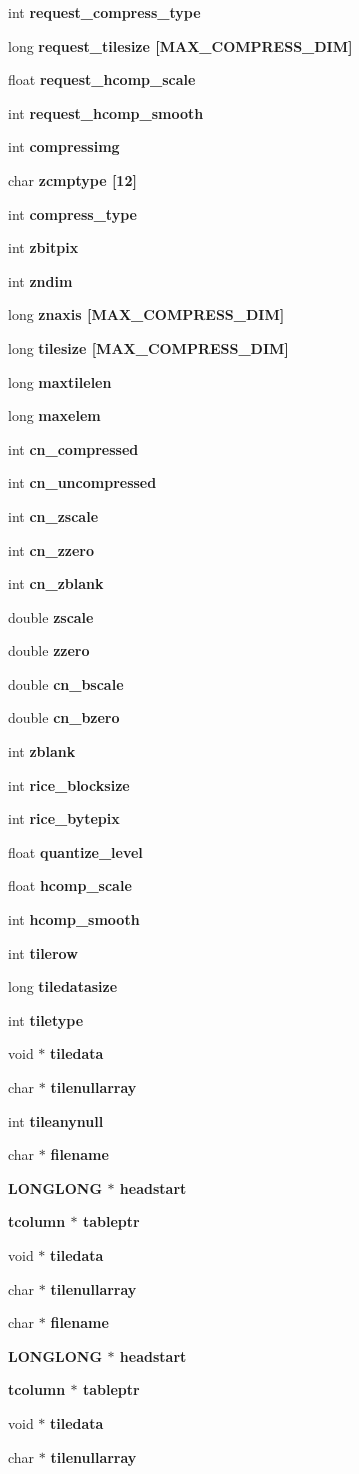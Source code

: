\begin{CompactItemize}
\item 
int \bf{request\_\-compress\_\-type}
\item 
long \bf{request\_\-tilesize} [MAX\_\-COMPRESS\_\-DIM]
\item 
float \bf{request\_\-hcomp\_\-scale}
\item 
int \bf{request\_\-hcomp\_\-smooth}
\item 
int \bf{compressimg}
\item 
char \bf{zcmptype} [12]
\item 
int \bf{compress\_\-type}
\item 
int \bf{zbitpix}
\item 
int \bf{zndim}
\item 
long \bf{znaxis} [MAX\_\-COMPRESS\_\-DIM]
\item 
long \bf{tilesize} [MAX\_\-COMPRESS\_\-DIM]
\item 
long \bf{maxtilelen}
\item 
long \bf{maxelem}
\item 
int \bf{cn\_\-compressed}
\item 
int \bf{cn\_\-uncompressed}
\item 
int \bf{cn\_\-zscale}
\item 
int \bf{cn\_\-zzero}
\item 
int \bf{cn\_\-zblank}
\item 
double \bf{zscale}
\item 
double \bf{zzero}
\item 
double \bf{cn\_\-bscale}
\item 
double \bf{cn\_\-bzero}
\item 
int \bf{zblank}
\item 
int \bf{rice\_\-blocksize}
\item 
int \bf{rice\_\-bytepix}
\item 
float \bf{quantize\_\-level}
\item 
float \bf{hcomp\_\-scale}
\item 
int \bf{hcomp\_\-smooth}
\item 
int \bf{tilerow}
\item 
long \bf{tiledatasize}
\item 
int \bf{tiletype}
\item 
void $\ast$ \bf{tiledata}
\item 
char $\ast$ \bf{tilenullarray}
\item 
int \bf{tileanynull}
\item 
char $\ast$ \bf{filename}
\item 
\bf{LONGLONG} $\ast$ \bf{headstart}
\item 
\bf{tcolumn} $\ast$ \bf{tableptr}
\item 
void $\ast$ \bf{tiledata}
\item 
char $\ast$ \bf{tilenullarray}
\item 
char $\ast$ \bf{filename}
\item 
\bf{LONGLONG} $\ast$ \bf{headstart}
\item 
\bf{tcolumn} $\ast$ \bf{tableptr}
\item 
void $\ast$ \bf{tiledata}
\item 
char $\ast$ \bf{tilenullarray}
\end{CompactItemize}


